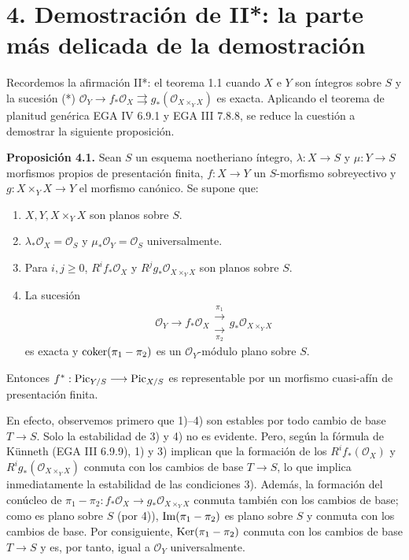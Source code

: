 
\providecommand{\sisi}[2]{#2}

\section*{4. Demostración de II*: la parte más delicada de la demostración}

Recordemos la afirmación II*: el teorema 1.1 cuando $X$ e $Y$ son íntegros
sobre $S$ y la sucesión (*)
$\mathcal O_Y\longrightarrow f_*\mathcal O_X\rightrightarrows
g_*(\mathcal O_{X\times_YX})$ es exacta. Aplicando el teorema de planitud
genérica EGA IV 6.9.1 y EGA III 7.8.8, se reduce la cuestión a demostrar la
siguiente proposición.

\textbf{Proposición 4.1.} Sean $S$ un esquema noetheriano íntegro,
$\lambda:X\to S$ y $\mu:Y\to S$ morfismos propios de presentación finita,
$f:X\to Y$ un $S$-morfismo sobreyectivo y
$g:X\times_YX\to Y$ el morfismo canónico. Se supone que:
\begin{enumerate}[label=\arabic*)]
\item $X,Y,X\times_YX$ son planos sobre $S$.
\item $\lambda_*\mathcal O_X=\mathcal O_S$ y
$\mu_*\mathcal O_Y=\mathcal O_S$ universalmente.
\item Para $i,j\geq0$, $R^if_*\mathcal O_X$ y
$R^jg_*\mathcal O_{X\times_YX}$ son planos sobre $S$.
\item La sucesión
\begin{equation}\tag{*}
\mathcal O_Y\longrightarrow f_*\mathcal O_X
\mathrel{\substack{\xrightarrow{\pi_1}\\[-0.7ex]\xrightarrow[\pi_2]{}}}
g_*\mathcal O_{X\times_YX}
\end{equation}
es exacta y $\operatorname{coker}(\pi_1-\pi_2)$ es un $\mathcal O_Y$-módulo plano sobre
$S$.
\end{enumerate}
Entonces
$f^*:\operatorname{Pic}_{Y/S}\longrightarrow\operatorname{Pic}_{X/S}$ es representable por un
morfismo cuasi-afín de presentación finita.

En efecto, observemos primero que 1)--4) son estables por todo cambio de base
$T\to S$. Solo la estabilidad de 3) y 4) no es evidente. Pero, según la
fórmula de Künneth (EGA III 6.9.9), 1) y 3) implican que la formación de los
$R^if_*(\mathcal O_X)$ y $R^ig_*(\mathcal O_{X\times_YX})$ conmuta con los
cambios de base $T\to S$, lo que implica inmediatamente la estabilidad de
las condiciones 3). Además, la formación del conúcleo de
$\pi_1-\pi_2:f_*\mathcal O_X\longrightarrow
g_*\mathcal O_{X\times_YX}$ conmuta también con los cambios de base; como
es plano sobre $S$ (por 4)), $\operatorname{Im}(\pi_1-\pi_2)$ es plano sobre $S$ y
conmuta con los cambios de base. Por consiguiente,
$\operatorname{Ker}(\pi_1-\pi_2)$ conmuta con los cambios de base $T\to S$ y es, por
tanto, igual a $\mathcal O_Y$ universalmente.

